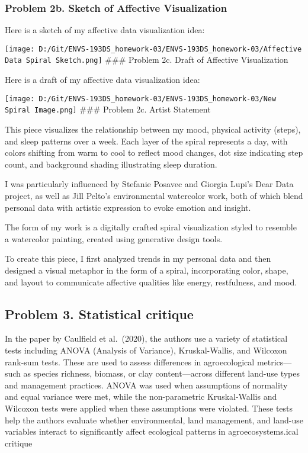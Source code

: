 \documentclass[
]{article}
\begin{document}
\subsubsection{Problem 2b. Sketch of Affective
Visualization}\label{problem-2b.-sketch-of-affective-visualization}

Here is a sketch of my affective data visualization idea:

\texttt{[image: D:/Git/ENVS-193DS\_homework-03/ENVS-193DS\_homework-03/Affective Data Spiral Sketch.png]}
\#\#\# Problem 2c. Draft of Affective Visualization

Here is a draft of my affective data visualization idea:

\texttt{[image: D:/Git/ENVS-193DS\_homework-03/ENVS-193DS\_homework-03/New Spiral Image.png]}
\#\#\# Problem 2c. Artist Statement

This piece visualizes the relationship between my mood, physical
activity (steps), and sleep patterns over a week. Each layer of the
spiral represents a day, with colors shifting from warm to cool to
reflect mood changes, dot size indicating step count, and background
shading illustrating sleep duration.

I was particularly influenced by Stefanie Posavec and Giorgia Lupi's
Dear Data project, as well as Jill Pelto's environmental watercolor
work, both of which blend personal data with artistic expression to
evoke emotion and insight.

The form of my work is a digitally crafted spiral visualization styled
to resemble a watercolor painting, created using generative design
tools.

To create this piece, I first analyzed trends in my personal data and
then designed a visual metaphor in the form of a spiral, incorporating
color, shape, and layout to communicate affective qualities like energy,
restfulness, and mood.

\subsection{Problem 3. Statistical
critique}\label{problem-3.-statistical-critique}

In the paper by Caulfield et al.~(2020), the authors use a variety of
statistical tests including ANOVA (Analysis of Variance),
Kruskal-Wallis, and Wilcoxon rank-sum tests. These are used to assess
differences in agroecological metrics---such as species richness,
biomass, or clay content---across different land-use types and
management practices. ANOVA was used when assumptions of normality and
equal variance were met, while the non-parametric Kruskal-Wallis and
Wilcoxon tests were applied when these assumptions were violated. These
tests help the authors evaluate whether environmental, land management,
and land-use variables interact to significantly affect ecological
patterns in agroecosystems.ical critique
\end{document}

